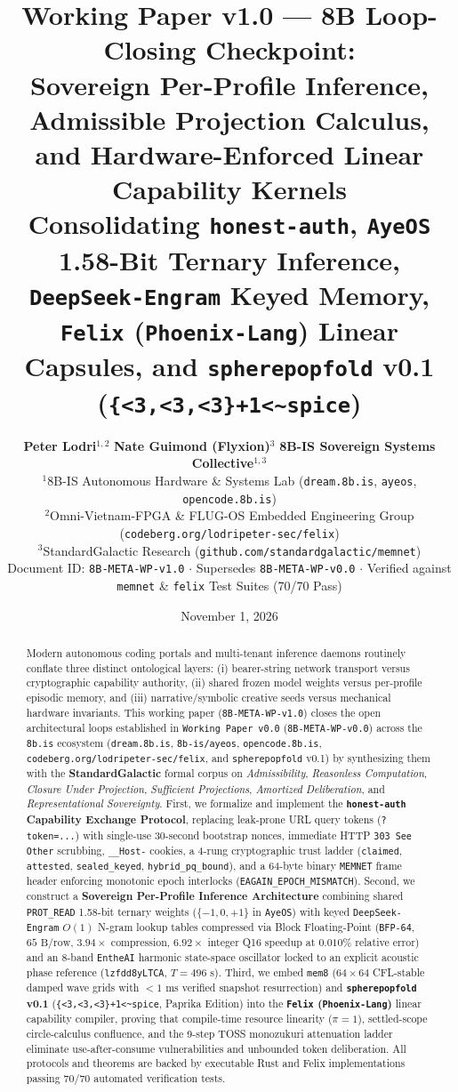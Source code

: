 \documentclass[10pt,twocolumn,letterpaper]{article}
\title{\vspace{-1.4em}\textbf{\Large Working Paper v1.0 --- 8B Loop-Closing Checkpoint:\\
Sovereign Per-Profile Inference, Admissible Projection Calculus,\\
and Hardware-Enforced Linear Capability Kernels}\\[0.5em]
\large Consolidating \texttt{honest-auth}, \texttt{AyeOS} 1.58-Bit Ternary Inference, \texttt{DeepSeek-Engram} Keyed Memory,\\
\texttt{Felix} (\texttt{Phoenix-Lang}) Linear Capsules, and \texttt{spherepopfold} v0.1 (\texttt{\{<3,<3,<3\}+1<\textasciitilde spice})}
\author{
\textbf{Peter Lodri}$^{1,2}$ \qquad \textbf{Nate Guimond (Flyxion)}$^{3}$ \qquad \textbf{8B-IS Sovereign Systems Collective}$^{1,3}$\\[0.3em]
\small $^{1}$8B-IS Autonomous Hardware \& Systems Lab (\texttt{dream.8b.is}, \texttt{ayeos}, \texttt{opencode.8b.is})\\
\small $^{2}$Omni-Vietnam-FPGA \& FLUG-OS Embedded Engineering Group (\texttt{codeberg.org/lodripeter-sec/felix})\\
\small $^{3}$StandardGalactic Research (\texttt{github.com/standardgalactic/memnet})\\[0.2em]
\footnotesize Document ID: \texttt{8B-META-WP-v1.0} $\cdot$ Supersedes \texttt{8B-META-WP-v0.0} $\cdot$ Verified against \texttt{memnet} \& \texttt{felix} Test Suites (70/70 Pass)
}
\date{\small November 1, 2026}
\begin{document}
\maketitle
\sloppy

\begin{abstract}
\noindent
Modern autonomous coding portals and multi-tenant inference daemons routinely conflate three distinct ontological layers: (i) bearer-string network transport versus cryptographic capability authority, (ii) shared frozen model weights versus per-profile episodic memory, and (iii) narrative/symbolic creative seeds versus mechanical hardware invariants. This working paper (\texttt{8B-META-WP-v1.0}) closes the open architectural loops established in \texttt{Working Paper v0.0} (\texttt{8B-META-WP-v0.0}) across the \texttt{8b.is} ecosystem (\texttt{dream.8b.is}, \texttt{8b-is/ayeos}, \texttt{opencode.8b.is}, \texttt{codeberg.org/lodripeter-sec/felix}, and \texttt{spherepopfold} v0.1) by synthesizing them with the \textbf{StandardGalactic} formal corpus on \emph{Admissibility}, \emph{Reasonless Computation}, \emph{Closure Under Projection}, \emph{Sufficient Projections}, \emph{Amortized Deliberation}, and \emph{Representational Sovereignty}. First, we formalize and implement the \textbf{\texttt{honest-auth} Capability Exchange Protocol}, replacing leak-prone URL query tokens (\texttt{?token=...}) with single-use 30-second bootstrap nonces, immediate HTTP \texttt{303 See Other} scrubbing, \texttt{\_\_Host-} cookies, a 4-rung cryptographic trust ladder (\texttt{claimed}, \texttt{attested}, \texttt{sealed\_keyed}, \texttt{hybrid\_pq\_bound}), and a 64-byte binary \texttt{MEMNET} frame header enforcing monotonic epoch interlocks (\texttt{EAGAIN\_EPOCH\_MISMATCH}). Second, we construct a \textbf{Sovereign Per-Profile Inference Architecture} combining shared \texttt{PROT\_READ} 1.58-bit ternary weights ($\{-1,0,+1\}$ in \texttt{AyeOS}) with keyed \texttt{DeepSeek-Engram} $O(1)$ N-gram lookup tables compressed via Block Floating-Point (\texttt{BFP-64}, $65\text{ B/row}$, $3.94\times$ compression, $6.92\times$ integer Q16 speedup at $0.010\%$ relative error) and an 8-band \texttt{EntheAI} harmonic state-space oscillator locked to an explicit acoustic phase reference (\texttt{lzfdd8yLTCA}, $T=496\text{ s}$). Third, we embed \texttt{mem8} ($64\times 64$ CFL-stable damped wave grids with $<1\text{ ms}$ verified snapshot resurrection) and \textbf{\texttt{spherepopfold} v0.1} (\texttt{\{<3,<3,<3\}+1<\textasciitilde spice}, Paprika Edition) into the \textbf{\texttt{Felix} (\texttt{Phoenix-Lang})} linear capability compiler, proving that compile-time resource linearity ($\pi=1$), settled-scope circle-calculus confluence, and the 9-step TOSS monozukuri attenuation ladder eliminate use-after-consume vulnerabilities and unbounded token deliberation. All protocols and theorems are backed by executable Rust and Felix implementations passing 70/70 automated verification tests.
\end{abstract}
\end{document}
